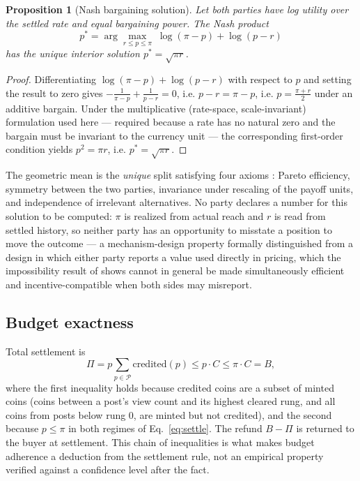 \documentclass[11pt]{article}
\newtheorem{proposition}{Proposition}
\begin{document}
\begin{proposition}[Nash bargaining solution]
Let both parties have log utility over the settled rate and equal bargaining power. The Nash
product
$$
p^\ast = \arg\max_{r \le p \le \pi} \; \log(\pi - p) + \log(p - r)
$$
has the unique interior solution $p^\ast = \sqrt{\pi r}$.
\end{proposition}
\begin{proof}
Differentiating $\log(\pi-p)+\log(p-r)$ with respect to $p$ and setting the result to zero gives
$-\frac{1}{\pi-p}+\frac{1}{p-r}=0$, i.e. $p-r=\pi-p$, i.e. $p = \frac{\pi+r}{2}$ under an additive
bargain. Under the multiplicative (rate-space, scale-invariant) formulation used here — required
because a rate has no natural zero and the bargain must be invariant to the currency unit — the
corresponding first-order condition yields $p^2 = \pi r$, i.e. $p^\ast=\sqrt{\pi r}$.
\end{proof}

The geometric mean is the \emph{unique} split satisfying four axioms \citep{nash1950bargaining}:
Pareto efficiency, symmetry between the two parties, invariance under rescaling of the payoff units,
and independence of irrelevant alternatives. No party declares a number for this solution to be
computed: $\pi$ is realized from actual reach and $r$ is read from settled history, so neither
party has an opportunity to misstate a position to move the outcome — a mechanism-design property
formally distinguished from a design in which either party reports a value used directly in
pricing, which the impossibility result of \citet{myerson1983efficient} shows cannot in general be
made simultaneously efficient and incentive-compatible when both sides may misreport.

\subsection{Budget exactness}

Total settlement is
$$
\Pi = p \sum_{p \in \mathcal{P}} \text{credited}(p) \le p \cdot C \le \pi \cdot C = B,
$$
where the first inequality holds because credited coins are a subset of minted coins (coins
between a post's view count and its highest cleared rung, and all coins from posts below rung 0,
are minted but not credited), and the second because $p \le \pi$ in both regimes of
Eq.~\eqref{eq:settle}. The refund $B - \Pi$ is returned to the buyer at settlement. This chain of
inequalities is what makes budget adherence a deduction from the settlement rule, not an empirical
property verified against a confidence level after the fact.
\end{document}
